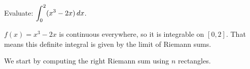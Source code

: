 \documentclass{ximera}
\begin{document}
\begin{question}
\begin{hint}
\begin{image}
\end{image}
\end{hint}
\end{question}



\begin{example}
	Evaluate: $\displaystyle \int_0^2 (x^3-2x) \mathop{}\!d x$.
	\begin{explanation}
		$f(x)=x^3-2x$ is continuous everywhere, so it is integrable on $[0,2]$.  That means this definite integral is given by the limit of Riemann sums.
		
		We start by computing the right Riemann sum using $n$ rectangles. 
		

\end{explanation}
\end{example}
\end{document}
